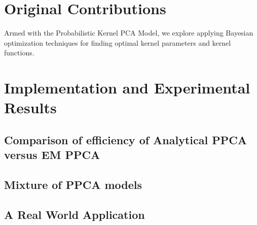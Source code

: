 \documentclass{article}
\begin{document}

\section{Original Contributions}
Armed with the Probabilistic Kernel PCA Model, we explore applying Bayesian optimization techniques for finding optimal kernel parameters and kernel functions.


\section{Implementation and Experimental Results}



\subsection{Comparison of efficiency of Analytical PPCA versus EM PPCA}

\subsection{Mixture of PPCA models}

\subsection{A Real World Application}




\end{document}
